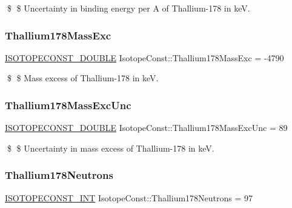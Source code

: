 \$ \$ Uncertainty in binding energy per A of Thallium-\/178 in keV. \mbox{\label{group___isotope_const-_thallium-_tl178_ga9bdb5a9ca435b014cd90dfe035ab5997}} 
\subsubsection{\texorpdfstring{Thallium178\+Mass\+Exc}{Thallium178MassExc}}
{\footnotesize\ttfamily \mbox{\hyperlink{group___isotope_const-_macros_ga8f45a7272ce02c0b4c65c44636ed719a}{I\+S\+O\+T\+O\+P\+E\+C\+O\+N\+S\+T\+\_\+\+D\+O\+U\+B\+LE}} Isotope\+Const\+::\+Thallium178\+Mass\+Exc = -\/4790}

\$ \$ Mass excess of Thallium-\/178 in keV. \mbox{\label{group___isotope_const-_thallium-_tl178_ga0c444e5b7a298cb2f4a7408cde30a586}} 
\subsubsection{\texorpdfstring{Thallium178\+Mass\+Exc\+Unc}{Thallium178MassExcUnc}}
{\footnotesize\ttfamily \mbox{\hyperlink{group___isotope_const-_macros_ga8f45a7272ce02c0b4c65c44636ed719a}{I\+S\+O\+T\+O\+P\+E\+C\+O\+N\+S\+T\+\_\+\+D\+O\+U\+B\+LE}} Isotope\+Const\+::\+Thallium178\+Mass\+Exc\+Unc = 89}

\$ \$ Uncertainty in mass excess of Thallium-\/178 in keV. \mbox{\label{group___isotope_const-_thallium-_tl178_gaae1a8755a03e505adbab10b22e21f537}} 
\subsubsection{\texorpdfstring{Thallium178\+Neutrons}{Thallium178Neutrons}}
{\footnotesize\ttfamily \mbox{\hyperlink{group___isotope_const-_macros_ga5f18360b3e99483a35c32d789e62621c}{I\+S\+O\+T\+O\+P\+E\+C\+O\+N\+S\+T\+\_\+\+I\+NT}} Isotope\+Const\+::\+Thallium178\+Neutrons = 97}

